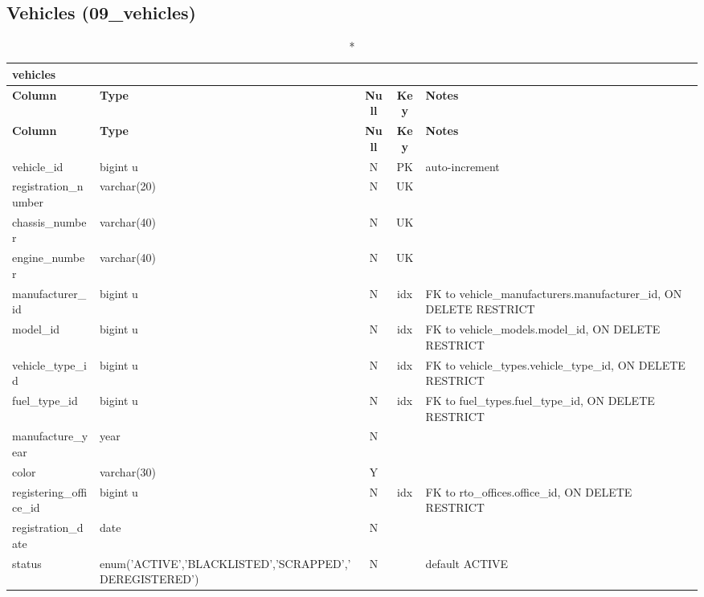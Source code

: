 \subsection*{Vehicles (09\_vehicles)}
\begin{longtable}{@{}p{3.4cm}p{2.9cm}c c p{5.6cm}@{}}
\caption*{\textbf{vehicles}}\\
\toprule \textbf{Column} & \textbf{Type} & \textbf{Null} & \textbf{Key} & \textbf{Notes} \\ \midrule \endfirsthead
\toprule \textbf{Column} & \textbf{Type} & \textbf{Null} & \textbf{Key} & \textbf{Notes} \\ \midrule \endhead
\bottomrule \endlastfoot
vehicle\_\allowbreak{}id & bigint u & N & PK & auto-increment \\
registration\_\allowbreak{}number & varchar(20) & N & UK &  \\
chassis\_\allowbreak{}number & varchar(40) & N & UK &  \\
engine\_\allowbreak{}number & varchar(40) & N & UK &  \\
manufacturer\_\allowbreak{}id & bigint u & N & idx & FK to vehicle\_\allowbreak{}manufacturers.manufacturer\_\allowbreak{}id, ON DELETE RESTRICT \\
model\_\allowbreak{}id & bigint u & N & idx & FK to vehicle\_\allowbreak{}models.model\_\allowbreak{}id, ON DELETE RESTRICT \\
vehicle\_\allowbreak{}type\_\allowbreak{}id & bigint u & N & idx & FK to vehicle\_\allowbreak{}types.vehicle\_\allowbreak{}type\_\allowbreak{}id, ON DELETE RESTRICT \\
fuel\_\allowbreak{}type\_\allowbreak{}id & bigint u & N & idx & FK to fuel\_\allowbreak{}types.fuel\_\allowbreak{}type\_\allowbreak{}id, ON DELETE RESTRICT \\
manufacture\_\allowbreak{}year & year & N &  &  \\
color & varchar(30) & Y &  &  \\
registering\_\allowbreak{}office\_\allowbreak{}id & bigint u & N & idx & FK to rto\_\allowbreak{}offices.office\_\allowbreak{}id, ON DELETE RESTRICT \\
registration\_\allowbreak{}date & date & N &  &  \\
status & enum('ACTIVE',\allowbreak{}'BLACKLISTED',\allowbreak{}'SCRAPPED',\allowbreak{}'DEREGISTERED') & N &  & default ACTIVE \\
\end{longtable}
\vspace{-0.4em}
